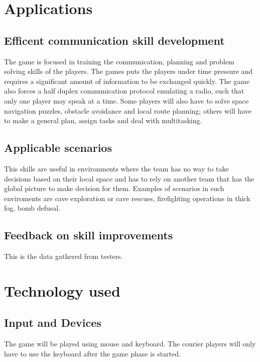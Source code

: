 \documentclass{article}
\begin{document}
\clearpage

\section{Applications}
\subsection{Efficent communication skill development}
The game is focused in training the communication, planning and problem solving skills of the players. The games puts the players under time pressure and requires a significant amount of information to be exchanged quickly. The game also forces a half duplex communication protocol emulating a radio, such that only one player may speak at a time. Some players will also have to solve space navigation puzzles, obstacle avoidance and local route planning; others will have to make a general plan, assign tasks and deal with multitasking.
\subsection{Applicable scenarios}
This skills are useful in environments where the team has no way to take decisions based on their local space and has to rely on another team that has the global picture to make decision for them. Examples of scenarios in such enviroments are cave exploration or cave rescues, firefighting operations in thick fog, bomb defusal. 
\subsection{Feedback on skill improvements}
This is the data gathered from testers.

\clearpage

\section{Technology used}

\subsection{Input and Devices}
The game will be played using mouse and keyboard. The courier players will only have to use the keyboard after the game phase is started.
\end{document}
